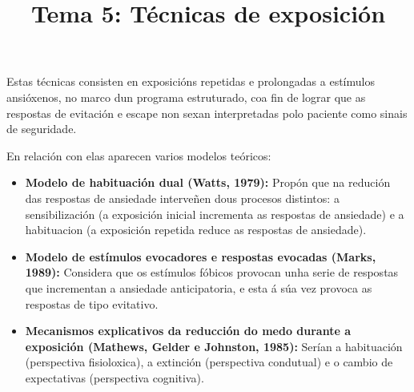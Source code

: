 \documentclass[a4paper,11pt]{article}
\title{Tema 5: Técnicas de exposición}
\date{}
\begin{document}
   

\maketitle 

Estas técnicas consisten en exposicións repetidas e prolongadas a estímulos ansióxenos, no marco dun programa estruturado, coa fin de lograr que as respostas de evitación e escape non sexan interpretadas polo paciente como sinais de seguridade.

En relación con elas aparecen varios modelos teóricos:
\begin{itemize}
	\item \textbf{Modelo de habituación dual (Watts, 1979):} Propón que na redución das respostas de 
	ansiedade interveñen dous procesos distintos: a sensibilización (a exposición inicial incrementa 
	as respostas de ansiedade) e a habituacion (a exposición repetida reduce as respostas de 
	ansiedade). 
	\item \textbf{Modelo de estímulos evocadores e respostas evocadas (Marks, 1989):} Considera que 
	os estímulos fóbicos provocan unha serie de respostas que incrementan a ansiedade anticipatoria, 
	e esta á súa vez provoca as respostas de tipo evitativo.
	\item \textbf{Mecanismos explicativos da reducción do medo durante a exposición (Mathews, Gelder 
	e Johnston, 1985):} Serían a habituación (perspectiva fisioloxica), a extinción (perspectiva 
	condutual) e o cambio de expectativas (perspectiva cognitiva).
\end{itemize}
\end{document}
